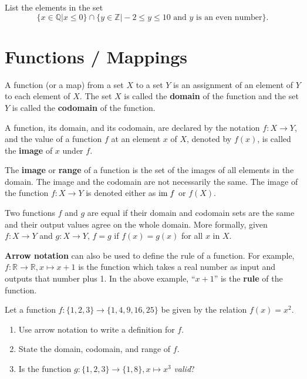 \begin{exercise}
    List the elements in the set
    \[
        \{x \in \mathbb{Q} \vert x \leq 0\} \cap \{y \in \mathbb{Z} \vert -2 \leq y \leq 10 \text{ and } y \text{ is an even number} \}.
    \]
\end{exercise}

\chapter{Functions / Mappings}
A function (or a map) from a set $X$ to a set $Y$ is an assignment of an element of $Y$ to each element of $X$. The set $X$ is called the \textbf{domain} of the function and the set $Y$ is called the \textbf{codomain} of the function.

A function, its domain, and its codomain, are declared by the notation $f: X\to Y$, and the value of a function $f$ at an element $x$ of $X$, denoted by $f(x)$, is called the \textbf{image} of $x$ under $f$.

The \textbf{image} or \textbf{range} of a function is the set of the images of all elements in the domain. The image and the codomain are not necessarily the same. The image of the function $f: X \to Y$ is denoted either as $\mathrm{im}\; f$ or $f(X)$.

Two functions $f$ and $g$ are equal if their domain and codomain sets are the same and their output values agree on the whole domain. More formally, given $f: X \to Y$ and $g: X \to Y$, $f = g$ if $f(x) = g(x)$ for all $x$ in $X$.

\textbf{Arrow notation} can also be used to define the rule of a function. For example, $f: \mathbb{R} \to \mathbb{R}, x \mapsto x+1$ is the function which takes a real number as input and outputs that number plus 1. In the above example, ``$x + 1$'' is the \textbf{rule} of the function.

\begin{exercise}
    Let a function $f: \{1, 2, 3\} \to \{1, 4, 9, 16, 25\}$ be given by the relation $f(x) = x^2$.
    \begin{enumerate}[label=(\roman*)]
        \item Use arrow notation to write a definition for $f$.
        \item State the domain, codomain, and range of $f$.
        \item Is the function $g: \{1, 2, 3\} \to \{1, 8\}, x \mapsto x^3$ \textit{valid}?
    \end{enumerate}
\end{exercise}

